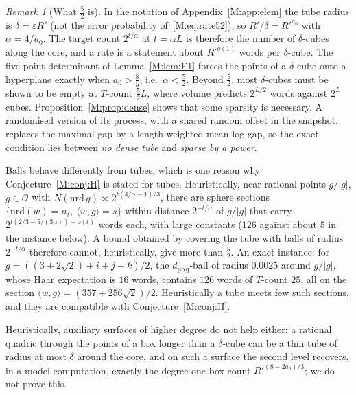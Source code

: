 \documentclass[aps,prx,twocolumn,superscriptaddress,nofootinbib,longbibliography]{revtex4-2}
\theoremstyle{plain}
\theoremstyle{definition}
\theoremstyle{remark}
\newtheorem{remark}{Remark}
\newcommand{\dproj}{d_{\mathrm{proj}}}
\begin{document}
\begin{remark}[What $\tfrac52$ is]\label{rem:what52}
In the notation of Appendix~\ref{M:app:elem} the tube radius is $\delta=\varepsilon R'$ (not the error probability of~\eqref{M:eq:rate52}), so $R'/\delta=R'^{a_0}$ with $\alpha=4/a_0$. The target count $2^{t/\alpha}$ at $t=\alpha L$ is therefore the number of $\delta$-cubes along the core, and a rate is a statement about $R'^{o(1)}$ words per $\delta$-cube. The five-point determinant of Lemma~\ref{M:lem:E1} forces the points of a $\delta$-cube onto a hyperplane exactly when $a_0>\tfrac85$, i.e.\ $\alpha<\tfrac52$. Beyond $\tfrac52$, most $\delta$-cubes must be shown to be empty at $T$-count $\tfrac52L$, where volume predicts $2^{L/2}$ words against $2^L$ cubes. Proposition~\ref{M:prop:dense} shows that some sparsity is necessary. A randomised version of its process, with a shared random offset in the snapshot, replaces the maximal gap by a length-weighted mean log-gap, so the exact condition lies between \emph{no dense tube} and \emph{sparse by a power}.

Balls behave differently from tubes, which is one reason why Conjecture~\ref{M:conj:H} is stated for tubes. Heuristically, near rational points $g/|g|$, $g\in\mathcal O$ with $N(\mathrm{nrd}\,g)\asymp2^{t(4/\alpha-1)/3}$, there are sphere sections $\{\mathrm{nrd}(w)=n_t,\ \langle w,g\rangle=s\}$ within distance $2^{-t/\alpha}$ of $g/|g|$ that carry $2^{t(2/3-5/(3\alpha))+o(t)}$ words each, with large constants ($126$ against about $5$ in the instance below). A bound obtained by covering the tube with balls of radius $2^{-t/\alpha}$ therefore cannot, heuristically, give more than $\tfrac52$. An exact instance: for $g=((3+2\sqrt2)+i+j-k)/2$, the $\dproj$-ball of radius $0.0025$ around $g/|g|$, whose Haar expectation is $16$ words, contains $126$ words of $T$-count $25$, all on the section $\langle w,g\rangle=(357+256\sqrt2)/2$. Heuristically a tube meets few such sections, and they are compatible with Conjecture~\ref{M:conj:H}.

Heuristically, auxiliary surfaces of higher degree do not help either: a rational quadric through the points of a box longer than a $\delta$-cube can be a thin tube of radius at most $\delta$ around the core, and on such a surface the second level recovers, in a model computation, exactly the degree-one box count $R'^{(8-2a_0)/3}$; we do not prove this.
\end{remark}
\end{document}
